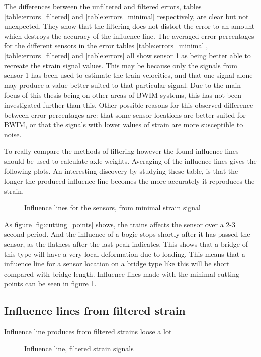 The differences between the unfiltered and filtered errors, tables \ref{table:errors_filtered} and \ref{table:errors_minimal} respectively, are clear but not unexpected. They show that the filtering does not distort the error to an amount which destroys the accuracy of the influence line. The averaged error percentages for the different sensors in the error tables \ref{table:errors_minimal}, \ref{table:errors_filtered} and \ref{table:errors} all show sensor 1 as being better able to recreate the strain signal values. This may be because only the signals from sensor 1 has been used to estimate the train velocities, and that one signal alone may produce a value better suited to that particular signal. Due to the main focus of this thesis being on other areas of BWIM systems, this has not been investigated further than this. Other possible reasons for this observed difference between error percentages are: that some sensor locations are better suited for BWIM, or that the signals with lower values of strain are more susceptible to noise.

 To really compare the methods of filtering however the found influence lines should be used to calculate axle weights. Averaging of the influence lines gives the following plots.
An interesting discovery by studying these table, is that the longer the produced influence line becomes the more accurately it reproduces the strain.
\begin{figure}[H]
	\begin{adjustbox}{center}
		
	\end{adjustbox}
	\caption{Influence lines for the sensors, from minimal strain signal}
	\label{fig:infl_minimal}
\end{figure}
As figure \ref{fig:cutting_points} shows, the trains affects the sensor over a 2-3 second period. And the influence of a bogie stops shortly after it has passed the sensor, as the flatness after the last peak indicates. This shows that a bridge of this type will have a very local deformation due to loading. This means that a influence line for a sensor location on a bridge type like this will be short compared with bridge length. Influence lines made with the minimal cutting points can be seen in figure \ref{fig:infl_minimal}.

\subsection{Influence lines from filtered strain}
Influence line produces from filtered strains loose a lot
\begin{figure}[H]
	\centering
	\begin{adjustbox}{center}
		
	\end{adjustbox}
	\caption{Influence line, filtered strain signals}
	\label{fig:infl_avg_filtered_before}
\end{figure}

